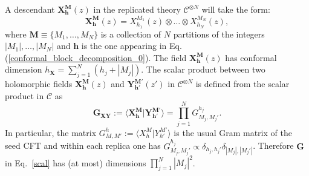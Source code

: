 \documentclass[a4paper,11pt]{article}
\begin{document}
 A descendant $\boldsymbol{X}^{\boldsymbol{M}}_{\boldsymbol{h}}(z)$ in the replicated theory  $\mathcal{C}^{\otimes N}$ will take the form:
 \begin{equation}
 \boldsymbol{X}_{\boldsymbol{h}}^{\boldsymbol{M}}(z)=X_{h_1}^{M_1}(z)\otimes \dots \otimes X_{h_N}^{M_N}(z),
\end{equation}
where $\boldsymbol{M}\equiv\{M_1,\dots,M_N\}$ is a collection of $N$ partitions of the  integers $|M_1|,\dots, |M_N|$ and $\boldsymbol{h}$ is the one appearing in Eq.(\ref{conformal_block_decomposition_0}). The field $\boldsymbol{X}^{\boldsymbol{M}}_{\boldsymbol{h}}(z)$ has  
conformal dimension  $h_{\boldsymbol{\boldsymbol{X}}}=\sum_{j=1}^N(h_j+|M_j|)$. The scalar product between two holomorphic fields $\boldsymbol{X}_{\boldsymbol{h}}^{\boldsymbol{M}}(z)$ and $\boldsymbol{Y}_{\boldsymbol{h}'}^{\boldsymbol{M}'}(z')$ in $\mathcal{C}^{\otimes N}$ is defined from the scalar product in $\mathcal{C}$ as
\begin{equation}
\label{scal}
 \boldsymbol{G}_{\boldsymbol{X}\boldsymbol{Y}}:=\langle \boldsymbol{X}_{\boldsymbol{h}}^{\boldsymbol{M}} | \boldsymbol{Y}_{\boldsymbol{h}'}^{\boldsymbol{M}'}\rangle=\prod_{j=1}^N G^{h_j}_{M_j,M_j'}.
\end{equation}
In particular, the matrix $G^{h}_{M,M'}:=\langle X_{h}^{M}|Y_{h'}^{M'}\rangle$ is the usual Gram matrix of the seed CFT and within each replica  one has $G^{h_j}_{M_j,M_j'}\propto\delta_{h_j,h_j'}\delta_{|M_j|,|M_j'|}$. Therefore $\boldsymbol{G}$ in Eq.~\eqref{scal} has (at most) dimensions  $\prod_{j=1}^{N}|M_j|^2$. 
\end{document}

